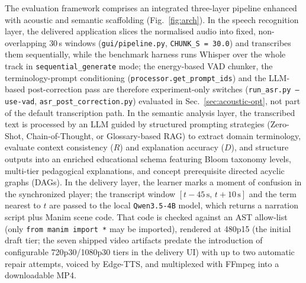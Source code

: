 \documentclass[conference]{IEEEtran}
\begin{document}
The evaluation framework comprises an integrated three-layer pipeline enhanced with acoustic and semantic scaffolding (Fig.~\ref{fig:arch}). In the speech recognition layer, the delivered application slices the normalised audio into fixed, non-overlapping $30$\,s windows (\texttt{gui/pipeline.py}, \texttt{CHUNK\_S = 30.0}) and transcribes them sequentially, while the benchmark harness runs Whisper over the whole track in \texttt{sequential\_generate} mode; the energy-based VAD chunker, the terminology-prompt conditioning (\texttt{processor.get\_prompt\_ids}) and the LLM-based post-correction pass are therefore experiment-only switches (\texttt{run\_asr.py --use-vad}, \texttt{asr\_post\_correction.py}) evaluated in Sec.~\ref{sec:acoustic-opt}, not part of the default transcription path. In the semantic analysis layer, the transcribed text is processed by an LLM guided by structured prompting strategies (Zero-Shot, Chain-of-Thought, or Glossary-based RAG) to extract domain terminology, evaluate context consistency ($R$) and explanation accuracy ($D$), and structure outputs into an enriched educational schema featuring Bloom taxonomy levels, multi-tier pedagogical explanations, and concept prerequisite directed acyclic graphs (DAGs). In the delivery layer, the learner marks a moment of confusion in the synchronized player; the transcript window $[t-45\,\text{s},\,t+10\,\text{s}]$ and the term nearest to $t$ are passed to the local \texttt{Qwen3.5-4B} model, which returns a narration script plus Manim scene code. That code is checked against an AST allow-list (only \texttt{from manim import *} may be imported), rendered at 480p15 (the initial draft tier; the seven shipped video artifacts predate the introduction of configurable 720p30/1080p30 tiers in the delivery UI) with up to two automatic repair attempts, voiced by Edge-TTS, and multiplexed with FFmpeg into a downloadable MP4.
\end{document}
